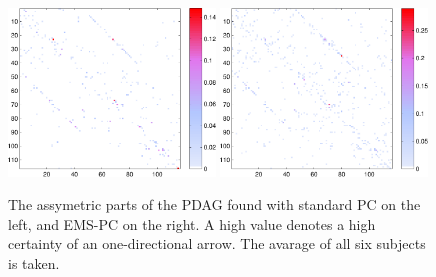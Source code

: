 \documentclass[a4paper, 10pt, english, onecolumn]{article}
\begin{document}
\begin{figure}[h!]
  \centering
  \includegraphics[width=0.49\textwidth]{images/new/assym_avg_mod-crop}
  \includegraphics[width=0.49\textwidth]{images/new/assym_avg_expl-crop}
  \caption{The assymetric parts of the PDAG found with standard PC on the left, and EMS-PC on the right. A high value denotes a high certainty of an one-directional arrow. The avarage of all six subjects is taken.}
  \label{fig:assym_avg}
\end{figure}
\end{document}
